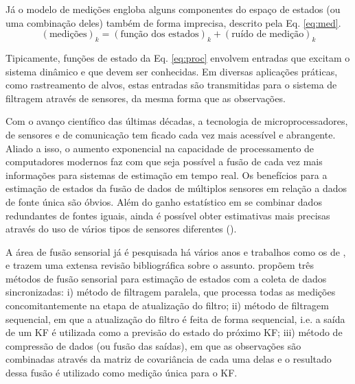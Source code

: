 Já o modelo de medições engloba alguns componentes do espaço de estados (ou uma combinação deles) também de forma imprecisa, descrito pela Eq. \ref{eq:med}.
\begin{equation}
	(\textrm{medições})_k=(\textrm{função dos estados})_k+(\textrm{ruído de medição})_k
	\label{eq:med}
\end{equation}

Tipicamente, funções de estado da Eq. \ref{eq:proc} envolvem entradas que excitam o sistema dinâmico e que devem ser conhecidas. Em diversas aplicações práticas, como rastreamento de alvos, estas entradas são transmitidas para o sistema de filtragem através de sensores, da mesma forma que as observações. 

Com o avanço científico das últimas décadas, a tecnologia de microprocessadores, de sensores e de comunicação tem ficado cada vez mais acessível e abrangente. Aliado a isso, o aumento exponencial na capacidade de processamento de computadores modernos faz com que seja possível a fusão de cada vez mais informações para sistemas de estimação em tempo real. Os benefícios para a estimação de estados da fusão de dados de múltiplos sensores em relação a dados de fonte única são óbvios. Além do ganho estatístico em se combinar dados redundantes de fontes iguais, ainda é possível obter estimativas mais precisas através do uso de vários tipos de sensores diferentes ().

A área de fusão sensorial já é pesquisada há vários anos e trabalhos como os de ,  e  trazem uma extensa revisão bibliográfica sobre o assunto.  propõem três métodos de fusão sensorial para estimação de estados com a coleta de dados sincronizadas: i) método de filtragem paralela, que processa todas as medições concomitantemente na etapa de atualização do filtro; ii) método de filtragem sequencial, em que a atualização do filtro é feita de forma sequencial, i.e. a saída de um KF é utilizada como a previsão do estado do próximo KF; iii) método de compressão de dados (ou fusão das saídas), em que as observações são combinadas através da matriz de covariância de cada uma delas e o resultado dessa fusão é utilizado como medição única para o KF.

